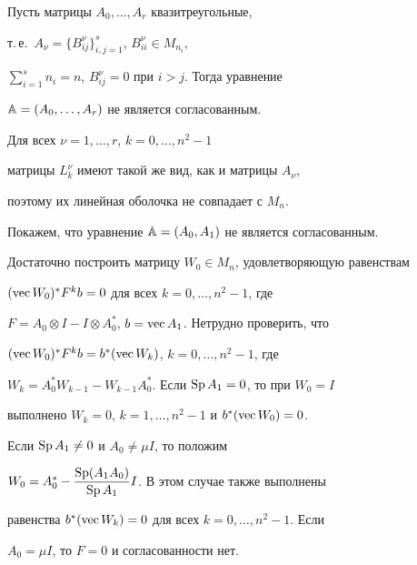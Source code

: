 \begin{cor}


\label{cor2}


Пусть матрицы $A_0,\dotsc,A_r$ квазитреугольные,


т.\,е.~$A_{\nu}=\{B_{ij}^{\nu}\}_{i,j=1}^s$, $B_{ii}^{\nu}\in M_{n_i}$,


$\sum\limits_{i=1}^sn_i=n$, $B_{ij}^{\nu}=0$ при  $i>j$. Тогда уравнение


$\Bbb A=(A_0,\dotsc,A_r)$ не является согласованным.


\end{cor}





\begin{pf} Для всех $\nu=1,\dotsc,r$, $k=0,\dotsc,n^2-1$


матрицы $L_k^{\nu}$ имеют такой же вид, как и матрицы $A_{\nu}$,


поэтому их линейная оболочка не совпадает с $M_n$.


\end{pf}





\begin{exam}


\label{ex2}


Покажем, что уравнение $\Bbb A=(A_0,A_1)$ не является согласованным.


Достаточно построить матрицу $W_0\in M_n$, удовлетворяющую равенствам


$(\operatorname{vec} W_0)^*F^kb=0$ для всех $k=0,\dotsc,n^2-1$, где


$F=A_0\otimes I-I\otimes A_0^*$, $b=\operatorname{vec} A_1$. Нетрудно проверить, что


$(\operatorname{vec} W_0)^*F^kb=b^*(\operatorname{vec} W_k)$, $k=0,\dotsc,n^2-1$, где


$W_k=A_0^*W_{k-1}-W_{k-1}A_0^*$. Если $\operatorname{Sp} A_1=0$, то при $W_0=I$


выполнено $W_k=0$, $k=1,\dotsc,n^2-1$ и $b^*(\operatorname{vec} W_0)=0$.


Если $\operatorname{Sp} A_1\ne 0$ и $A_0\ne\mu I$, то положим


$W_0=A_0^*-\dfrac{\operatorname{Sp}(A_1A_0)}{\operatorname{Sp} A_1}I$. В этом случае также выполнены


равенства $b^*(\operatorname{vec} W_k)=0$ для всех $k=0,\dotsc,n^2-1$. Если


$A_0=\mu I$, то $F=0$ и согласованности нет.


\end{exam}





